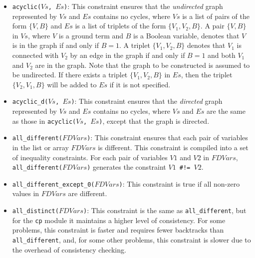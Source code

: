 \begin{itemize}
\item \texttt{acyclic($Vs$, $Es$)}: This constraint ensures that the \textit{undirected} graph represented by $Vs$ and $Es$ contains no cycles, where $Vs$ is a list of pairs of the form $\{V,B\}$ and $Es$ is a list of triplets of the form $\{V_1,V_2,B\}$. A pair $\{V,B\}$ in $Vs$, where $V$ is a ground term and $B$ is a Boolean variable, denotes that $V$ is in the graph if and only if $B = 1$. A triplet $\{V_1,V_2,B\}$ denotes that $V_1$ is connected with $V_2$  by an edge in the graph if and only if $B = 1$ and both $V_1$ and $V_2$ are in the graph. Note that the graph to be constructed is assumed to be undirected. If there exists a triplet $\{V_1,V_2,B\}$ in $Es$, then the triplet $\{V_2,V_1,B\}$ will be added to $Es$ if it is not specified.

\item \texttt{acyclic\_d($Vs$, $Es$)}: This constraint ensures that the \textit{directed} graph represented by $Vs$ and $Es$ contains no cycles, where $Vs$ and $Es$ are the same as those in \texttt{acyclic($Vs$, $Es$)}, except that the graph is directed.
    
\item \texttt{all\_different($FDVars$)}: This constraint ensures that each pair of variables in the list or array $FDVars$ is different. This constraint is compiled into a set of inequality constraints. For each pair of variables $V1$ and $V2$ in $FDVars$, \texttt{all\_different($FDVars$)} generates the constraint {\tt $V1$ \verb+#!=+ $V2$}.

\item \texttt{all\_different\_except\_0($FDVars$)}: This constraint is true if all non-zero values in $FDVars$ are different.	

\item \texttt{all\_distinct($FDVars$)}: This constraint is the same as \texttt{all\_different}, but for the \texttt{cp} module it maintains a higher level of consistency. For some problems, this constraint is faster and requires fewer backtracks than \texttt{all\_different}, and, for some other problems, this constraint is slower due to the overhead of consistency checking.


\end{itemize}
